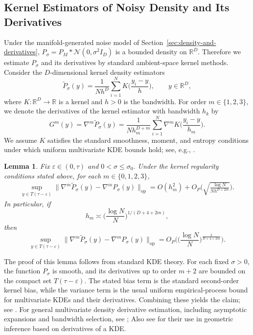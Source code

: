 \documentclass[11pt]{article}
\theoremstyle{plain}
\newtheorem{lemma}[theorem]{Lemma}
\theoremstyle{definition}
\begin{document}
\subsection{Kernel Estimators of Noisy Density and Its Derivatives}
Under the manifold-generated noise model of Section~\ref{sec:density-and-derivatives}, $P_\sigma=P_M*\mathcal N(0,\sigma^2 I_D)$ is a bounded density on $\mathbb R^D$. Therefore we estimate $P_\sigma$ and its derivatives by standard ambient-space kernel methods. 
Consider the $D$-dimensional kernel density estimators
\[
\widetilde P_\sigma(y)=\frac{1}{N h^D}\sum_{i=1}^N K\big(\frac{y_i-y}{h}\big),
\qquad y\in\mathbb R^D,
\]
where $K:\mathbb R^D\to\mathbb R$ is a kernel and $h>0$ is the bandwidth. For order $m \in \{1,2,3\}$, we denote the derivatives of the kernel estimator with bandwidth $h_k$  by
\[
G^m(y) = \nabla^m \widetilde{P}_\sigma(y) =  \frac{1}{Nh_m^{D+m}}\sum_{i=1}^N\nabla^m K\big(\frac{y_i-y}{h_m}\big).
\]
We assume $K$ satisfies the standard smoothness,
moment, and entropy conditions under which uniform multivariate KDE bounds hold; see, e.g., \citet{Gine2002RatesOS}. 
\begin{lemma}\label{lem:kernel-density-estimator}
Fix $\varepsilon\in(0,\tau)$ and $0<\sigma\le \sigma_0$. Under the kernel regularity conditions stated above, for each $m\in\{0,1,2,3\}$,
    \begin{align}
        \sup_{y\in T(\tau-\varepsilon)} \|\nabla^m\widetilde{P}_\sigma(y) - \nabla^m P_\sigma(y)\|_{\mathrm{op}} 
        = O(h_m^2) + O_P\big(\sqrt{\frac{\log N}{N h^{D+2m}}}\big).
    \end{align}
 In particular, if
\[
h_m\asymp \big(\frac{\log N}{N}\big)^{{1}/(D+4+2m)},
\]
then
\[
\sup_{y\in T(\tau-\varepsilon)}
\|\nabla^m \widetilde P_\sigma(y)-\nabla^m P_\sigma(y)\|_{\mathrm{op}}
=
O_P\big(
\big(\frac{\log N}{N}\big)^{\frac{2}{D+4+2m}}
\big).
\]
\end{lemma}
The proof of this lemma follows from standard KDE theory. For each fixed $\sigma>0$, the function $P_\sigma$ is smooth, and its derivatives up to order $m+2$ are bounded on the compact set $T(\tau-\varepsilon )$. The stated bias term is the standard second-order kernel bias, while the variance term is the usual uniform empirical-process bound for multivariate KDEs and their derivatives. Combining these yields the claim; see \citet{Gine2002RatesOS, einmahl2005uniform}. For general multivariate density derivative estimation, including asymptotic expansions and bandwidth selection, see \citet{chacon2011asymptotics}; Also see \citet{Genovese2014Ridge,Chen2015ridge} for their use in geometric inference based on derivatives of a KDE.
\end{document}
